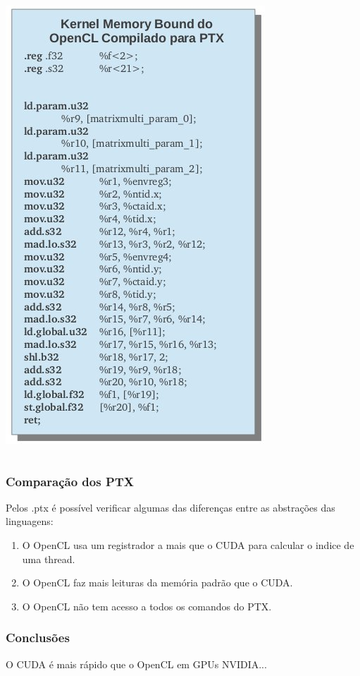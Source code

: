 \documentclass[brazil]{beamer}
\begin{document}
\begin{frame}[fragile]
\begin{columns}
\begin{column}{.5\textwidth}
      \includegraphics[scale=0.3]{MemBoOpcl.jpg}
    \end{column}
  \end{columns}
\end{frame}

\begin{frame}[fragile]
  \frametitle{Comparação dos PTX}
  Pelos .ptx é possível verificar algumas das diferenças entre as abstrações das linguagens:
  \begin{enumerate}
    \item O OpenCL usa um registrador a mais que o CUDA para calcular o indice de uma thread.
    \item O OpenCL faz mais leituras da memória padrão que o CUDA. 
    \item O OpenCL não tem acesso a todos os comandos do PTX.
  \end{enumerate}
\end{frame}

\begin{frame}[fragile]
  \frametitle{Conclusões}
    O CUDA é mais rápido que o OpenCL em GPUs NVIDIA...
\end{frame}
\end{document}
